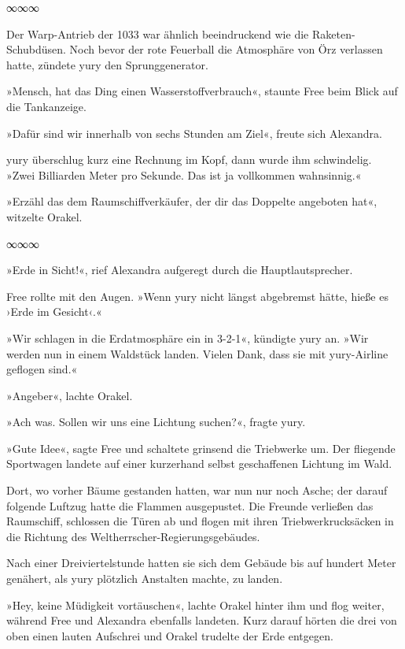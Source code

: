 \begin{center}
    ∞∞∞
\end{center}

Der Warp-Antrieb der 1033 war ähnlich beeindruckend wie die Raketen-Schubdüsen. Noch bevor der rote Feuerball die Atmosphäre von Örz verlassen hatte, zündete yury den Sprunggenerator.

»Mensch, hat das Ding einen Wasserstoffverbrauch«, staunte Free beim Blick auf die Tankanzeige.

»Dafür sind wir innerhalb von sechs Stunden am Ziel«, freute sich Alexandra.

yury überschlug kurz eine Rechnung im Kopf, dann wurde ihm schwindelig. »Zwei Billiarden Meter pro Sekunde. Das ist ja vollkommen wahnsinnig.«

»Erzähl das dem Raumschiffverkäufer, der dir das Doppelte angeboten hat«, witzelte Orakel.

\begin{center}
    ∞∞∞
\end{center}

»Erde in Sicht!«, rief Alexandra aufgeregt durch die Hauptlautsprecher.

Free rollte mit den Augen. »Wenn yury nicht längst abgebremst hätte, hieße es ›Erde im Gesicht‹.«

»Wir schlagen in die Erdatmosphäre ein in 3-2-1«, kündigte yury an. »Wir werden nun in einem Waldstück landen. Vielen Dank, dass sie mit yury-Airline geflogen sind.«

»Angeber«, lachte Orakel.

»Ach was. Sollen wir uns eine Lichtung suchen?«, fragte yury.

»Gute Idee«, sagte Free und schaltete grinsend die Triebwerke um. Der fliegende Sportwagen landete auf einer kurzerhand selbst geschaffenen Lichtung im Wald.

Dort, wo vorher Bäume gestanden hatten, war nun nur noch Asche; der darauf folgende Luftzug hatte die Flammen ausgepustet. Die Freunde verließen das Raumschiff, schlossen die Türen ab und flogen mit ihren Triebwerkrucksäcken in die Richtung des Weltherrscher-Regierungsgebäudes.

Nach einer Dreiviertelstunde hatten sie sich dem Gebäude bis auf hundert Meter genähert, als yury plötzlich Anstalten machte, zu landen.

»Hey, keine Müdigkeit vortäuschen«, lachte Orakel hinter ihm und flog weiter, während Free und Alexandra ebenfalls landeten. Kurz darauf hörten die drei von oben einen lauten Aufschrei und Orakel trudelte der Erde entgegen.

